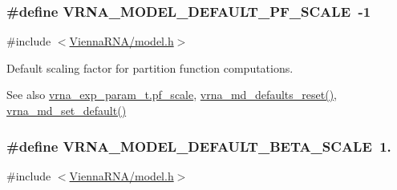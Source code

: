 \subsubsection[{\texorpdfstring{V\+R\+N\+A\+\_\+\+M\+O\+D\+E\+L\+\_\+\+D\+E\+F\+A\+U\+L\+T\+\_\+\+P\+F\+\_\+\+S\+C\+A\+LE}{VRNA_MODEL_DEFAULT_PF_SCALE}}]{\setlength{\rightskip}{0pt plus 5cm}\#define V\+R\+N\+A\+\_\+\+M\+O\+D\+E\+L\+\_\+\+D\+E\+F\+A\+U\+L\+T\+\_\+\+P\+F\+\_\+\+S\+C\+A\+LE~-\/1}\hypertarget{group__model__details_ga5505389cba74a18bbc116d2bb20256fa}{}\label{group__model__details_ga5505389cba74a18bbc116d2bb20256fa}


{\ttfamily \#include $<$\hyperlink{model_8h}{Vienna\+R\+N\+A/model.\+h}$>$}



Default scaling factor for partition function computations. 

\begin{DoxySeeAlso}{See also}
\hyperlink{group__energy__parameters_a53c12f0d74f94ce371e0471a8ab5a377}{vrna\+\_\+exp\+\_\+param\+\_\+t.\+pf\+\_\+scale}, \hyperlink{group__model__details_ga70834424cf804d149937de89f80ceb45}{vrna\+\_\+md\+\_\+defaults\+\_\+reset()}, \hyperlink{group__model__details_ga8ac6ff84936282436f822644bf841f66}{vrna\+\_\+md\+\_\+set\+\_\+default()} 
\end{DoxySeeAlso}
\subsubsection[{\texorpdfstring{V\+R\+N\+A\+\_\+\+M\+O\+D\+E\+L\+\_\+\+D\+E\+F\+A\+U\+L\+T\+\_\+\+B\+E\+T\+A\+\_\+\+S\+C\+A\+LE}{VRNA_MODEL_DEFAULT_BETA_SCALE}}]{\setlength{\rightskip}{0pt plus 5cm}\#define V\+R\+N\+A\+\_\+\+M\+O\+D\+E\+L\+\_\+\+D\+E\+F\+A\+U\+L\+T\+\_\+\+B\+E\+T\+A\+\_\+\+S\+C\+A\+LE~1.}\hypertarget{group__model__details_ga383d3ac8d08c3b6221754b50871c1200}{}\label{group__model__details_ga383d3ac8d08c3b6221754b50871c1200}


{\ttfamily \#include $<$\hyperlink{model_8h}{Vienna\+R\+N\+A/model.\+h}$>$}



